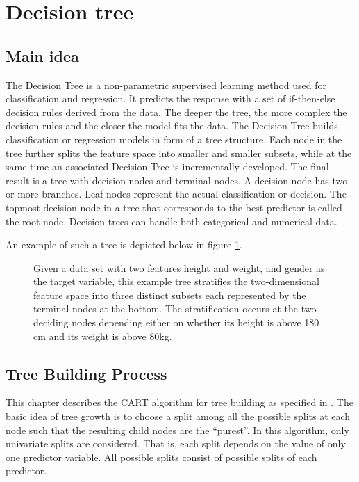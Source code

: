\section{Decision tree}

\subsection{Main idea}
The Decision Tree is a non-parametric supervised learning method used for classification and regression.
It predicts the response with a set of if-then-else decision rules derived from the data.
The deeper the tree, the more complex the decision rules and the closer the model fits the data.
The Decision Tree builds classification or regression models in form of a tree structure.
Each node in the tree further splits the feature space into smaller and smaller subsets, 
while at the same time an associated Decision Tree is incrementally developed.
The final result is a tree with decision nodes and terminal nodes. 
A decision node has two or more branches.
Leaf nodes represent the actual classification or decision. 
The topmost decision node in a tree that corresponds to the best predictor is called the root node.
Decision trees can handle both categorical and numerical data.

An example of such a tree is depicted below in figure \ref{fig:decision_tree_example}.

\begin{figure}[H]
    \captionsetup{format=plain}
    \caption{Given a data set with two features height and weight, and gender as the target variable, 
             this example tree stratifies the two-dimensional feature space into three distinct subsets each 
             represented by the terminal nodes at the bottom.
             The stratification occurs at the two deciding nodes depending either on whether its height is above 180 cm 
             and its weight is above 80kg.
             }
    \label{fig:decision_tree_example}
\end{figure}
\subsection{Tree Building Process}
This chapter describes the CART algorithm for tree building as specified in \cite{breiman1984classification}.
The basic idea of tree growth is to choose a split among all the possible splits at each node
such that the resulting child nodes are the “purest”. In this algorithm, only univariate splits are
considered. That is, each split depends on the value of only one predictor variable. All
possible splits consist of possible splits of each predictor.

